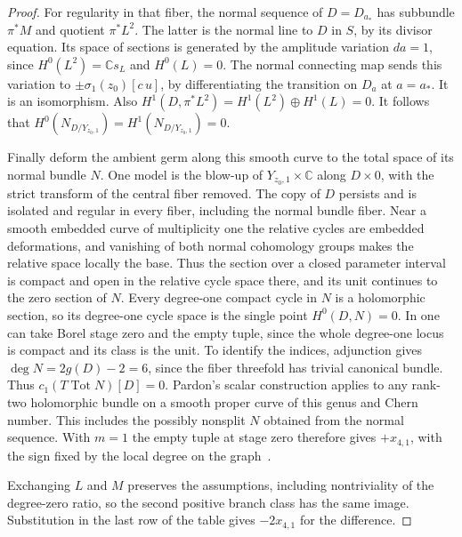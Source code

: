 \begin{proof}
For regularity in that fiber, the normal sequence of $D=D_{a_*}$
has subbundle $\pi^*M$ and quotient $\pi^*L^2$. The latter is
the normal line to $D$ in $S$, by its divisor equation.
Its space of sections is generated by the amplitude variation
$da=1$, since $H^0(L^2)=\mathbb C s_L$ and $H^0(L)=0$.
The normal connecting map sends this variation to
$\pm\sigma_1(z_0)[c\,u]$, by differentiating the transition
on $D_a$ at $a=a_*$. It is an isomorphism. Also
$H^1(D,\pi^*L^2)=H^1(L^2)\oplus H^1(L)=0$. It follows that
$H^0(N_{D/Y_{z_0,1}})=H^1(N_{D/Y_{z_0,1}})=0$.

Finally deform the ambient germ along this smooth curve to the
total space of its normal bundle $N$. One model is the blow-up
of $Y_{z_0,1}\times\mathbb C$ along $D\times0$, with the
strict transform of the central fiber removed. The copy of $D$
persists and is isolated and regular in every fiber, including
the normal bundle fiber. Near a smooth embedded curve of multiplicity
one the relative cycles are embedded deformations, and vanishing
of both normal cohomology groups makes the relative space locally
the base. Thus the section over a closed parameter interval is
compact and open in the relative cycle space there, and its unit
continues to the zero section of $N$. Every degree-one compact
cycle in $N$ is a holomorphic section, so its degree-one cycle
space is the single point $H^0(D,N)=0$. In \cite[Definition~4.7]{Pardon} one can take Borel stage zero and the empty tuple,
since the whole degree-one locus is compact and its class is the unit.
To identify the indices, adjunction gives
$\deg N=2g(D)-2=6$, since the fiber threefold has trivial
canonical bundle. Thus $c_1(T\operatorname{Tot}N)[D]=0$.
Pardon's scalar construction applies to any rank-two holomorphic
bundle on a smooth proper curve of this genus and Chern number.
This includes the possibly nonsplit $N$ obtained from the normal
sequence. With $m=1$ the empty tuple at stage zero therefore gives
$+x_{4,1}$, with the sign fixed by the local degree on the graph~\cite[Remark 4.1 and Definition 4.7]{Pardon}.

Exchanging $L$ and $M$ preserves the assumptions, including
nontriviality of the degree-zero ratio, so the second positive
branch class has the same image. Substitution in the last row of
the table gives $-2x_{4,1}$ for the difference.
\end{proof}
